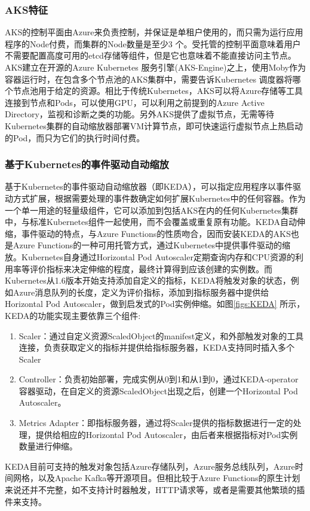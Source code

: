 \documentclass[11pt]{article}
\begin{document}
\subsubsection{AKS特征}
AKS的控制平面由Azure来负责控制，并保证是单租户使用的，而只需为运行应用程序的Node付费，而集群的Node数量是至少3 个。受托管的控制平面意味着用户不需要配置高度可用的etcd存储等组件，但是它也意味着不能直接访问主节点。AKS建立在开源的Azure Kubernetes 服务引擎(AKS-Engine)之上，使用Moby作为容器运行时，在包含多个节点池的AKS集群中，需要告诉Kubernetes 调度器将哪个节点池用于给定的资源。相比于传统Kubernetes，AKS可以将Azure存储等工具连接到节点和Pods，可以使用GPU，可以利用之前提到的Azure Active Directory，监视和诊断之类的功能。另外AKS提供了虚拟节点，无需等待Kubernetes集群的自动缩放器部署VM计算节点，即可快速运行虚拟节点上热启动的Pod，而只为它们的执行时间付费。

\subsubsection{基于Kubernetes的事件驱动自动缩放}
基于Kubernetes的事件驱动自动缩放器（即KEDA），可以指定应用程序以事件驱动方式扩展，根据需要处理的事件数确定如何扩展Kubernetes中的任何容器。作为一个单一用途的轻量级组件，它可以添加到包括AKS在内的任何Kubernetes集群中，与标准Kubernetes组件一起使用，而不会覆盖或重复原有功能。KEDA自动伸缩，事件驱动的特点，与Azure Functions的性质吻合，因而安装KEDA的AKS也是Azure Functions的一种可用托管方式，通过Kubernetes中提供事件驱动的缩放。Kubernetes自身通过Horizontal Pod Autoscaler定期查询内存和CPU资源的利用率等评价指标来决定伸缩的程度，最终计算得到应该创建的实例数。而Kubernetes从1.6版本开始支持添加自定义的指标，KEDA将触发对象的状态，例如Azure消息队列的长度，定义为评价指标，添加到指标服务器中提供给Horizontal Pod Autoscaler，做到启发式的Pod实例伸缩。如图\ref{figs:KEDA} 所示，KEDA的功能实现主要依靠三个组件:
\begin{enumerate}
	\item Scaler：通过自定义资源ScaledObject的manifest定义，和外部触发对象的工具连接，负责获取定义的指标并提供给指标服务器，KEDA支持同时插入多个Scaler
	\item Controller：负责初始部署，完成实例从0到1和从1到0，通过KEDA-operator容器驱动，在自定义的资源ScaledObject出现之后，创建一个Horizontal Pod Autoscaler。
	\item Metrics Adapter：即指标服务器，通过将Scaler提供的指标数据进行一定的处理，提供给相应的Horizontal Pod Autoscaler，由后者来根据指标对Pod实例数量进行伸缩。
\end{enumerate}
KEDA目前可支持的触发对象包括Azure存储队列，Azure服务总线队列，Azure时间网格，以及Apache Kafka等开源项目。但相比较于Azure Functions的原生计划来说还并不完整，如不支持计时器触发，HTTP请求等，或者是需要其他繁琐的插件来支持。
\end{document}
